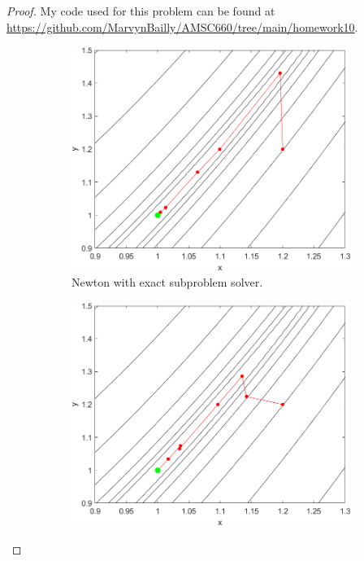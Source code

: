 \documentclass[12pt]{report}
\begin{document}
\begin{problem}
\begin{proof}
My code used for this problem can be found at \url{https://github.com/MarvynBailly/AMSC660/tree/main/homework10}.

\begin{figure}[H]
    \begin{subfigure}[b]{0.5\linewidth}
        \centering
        \includegraphics[width=\linewidth]{images/4-cont-N-1.2,1.2.png}
        \caption{Newton with exact subproblem solver.}
        \label{fig4-1:a}
        \vspace{4ex}
    \end{subfigure}%
    \begin{subfigure}[b]{0.5\linewidth}
        \centering
        \includegraphics[width=\linewidth]{images/4-cont-BFGS-1.2,1.2.png}

\end{subfigure}
\end{figure}
\end{proof}
\end{problem}
\end{document}
